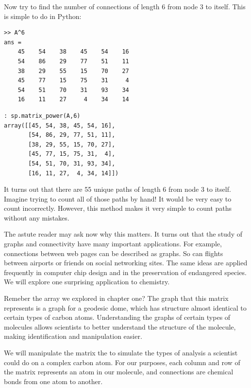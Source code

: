 Now try to find the number of connections of length 6 from node 3 to itself. This is simple to do in Python:
\begin{matlab}
\begin{lstlisting}[style=matlab]
>> A^6
ans =
    45    54    38    45    54    16
    54    86    29    77    51    11
    38    29    55    15    70    27
    45    77    15    75    31     4
    54    51    70    31    93    34
    16    11    27     4    34    14
\end{lstlisting}
\end{matlab}
\begin{python}
\begin{lstlisting}[style=python]
: sp.matrix_power(A,6)
array([[45, 54, 38, 45, 54, 16],
       [54, 86, 29, 77, 51, 11],
       [38, 29, 55, 15, 70, 27],
       [45, 77, 15, 75, 31,  4],
       [54, 51, 70, 31, 93, 34],
       [16, 11, 27,  4, 34, 14]])
\end{lstlisting}
\end{python}
It turns out that there are 55 unique paths of length 6 from node 3 to itself. Imagine trying to count all of those paths by hand! It would be very easy to count incorrectly. However, this method makes it very simple to count paths without any mistakes.

The astute reader may ask now why this matters. It turns out that the study of graphs and connectivity have many important applications. For example, connections between web pages can be described as graphs. So can flights between airports or friends on social networking sites. The same ideas are applied frequently in computer chip design and in the preservation of endangered species. We will explore one surprising application to chemistry.

Remeber the  array we explored in chapter one? The graph that this matrix represents is a graph for a geodesic dome, which has structure almost identical to certain types of carbon atoms. Understanding the graphs of certain types of molecules allows scientists to better understand the structure of the molecule, making identification and manipulation easier.

We will manipulate the matrix the  to simulate the types of analysis a scientist could do on a complex carbon atom. For our purposes, each column and row of the  matrix represents an atom in our molecule, and connections are chemical bonds from one atom to another.

